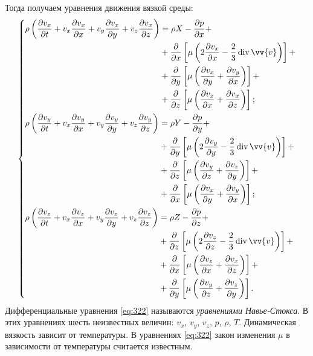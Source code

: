	Тогда получаем уравнения движения вязкой среды:
	\begin{gather}
		\begin{dcases}\label{eq:322}
			\begin{aligned}
				\rho\left(\frac{\pp v_x}{\pp t} + v_x\frac{\pp v_x}{\pp x} + v_y\frac{\pp v_x}{\pp y} + v_z\frac{\pp v_x}{\pp z}\right) &= \rho X - \frac{\pp p}{\pp x} +\\&+ \frac{\pp}{\pp x}\left[\mu\left(2\frac{\pp v_x}{\pp x} - \frac{2}{3}\diverg\vv{v}\right)\right] +\\&+ \frac{\pp}{\pp y}\left[\mu\left(\frac{\pp v_x}{\pp y} + \frac{\pp v_y}{\pp x}\right)\right] +\\&+ \frac{\pp}{\pp z}\left[\mu\left(\frac{\pp v_z}{\pp x} + \frac{\pp v_x}{\pp z}\right)\right];
			\end{aligned}\\
			\begin{aligned}
				\rho\left(\frac{\pp v_y}{\pp t} + v_x\frac{\pp v_y}{\pp x} + v_y\frac{\pp v_y}{\pp y} + v_z\frac{\pp v_y}{\pp z}\right) &= \rho Y - \frac{\pp p}{\pp y} +\\&+ \frac{\pp}{\pp y}\left[\mu\left(2\frac{\pp v_y}{\pp y} - \frac{2}{3}\diverg\vv{v}\right)\right] +\\&+ \frac{\pp}{\pp z}\left[\mu\left(\frac{\pp v_y}{\pp z} + \frac{\pp v_z}{\pp y}\right)\right] +\\&+ \frac{\pp}{\pp x}\left[\mu\left(\frac{\pp v_x}{\pp y} + \frac{\pp v_y}{\pp x}\right)\right];
			\end{aligned}\\
			\begin{aligned}
				\rho\left(\frac{\pp v_z}{\pp t} + v_x\frac{\pp v_z}{\pp x} + v_y\frac{\pp v_z}{\pp y} + v_z\frac{\pp v_z}{\pp z}\right) &= \rho Z - \frac{\pp p}{\pp z} +\\&+ \frac{\pp}{\pp z}\left[\mu\left(2\frac{\pp v_z}{\pp z} - \frac{2}{3}\diverg\vv{v}\right)\right] +\\&+ \frac{\pp}{\pp x}\left[\mu\left(\frac{\pp v_z}{\pp x} + \frac{\pp v_x}{\pp z}\right)\right] +\\&+ \frac{\pp}{\pp y}\left[\mu\left(\frac{\pp v_y}{\pp z} + \frac{\pp v_z}{\pp y}\right)\right].
			\end{aligned}
		\end{dcases}
	\end{gather}\n
	Дифференциальные уравнения \eqref{eq:322} называются \textit{уравнениями Навье-Стокса}. В этих уравнениях шесть неизвестных величин: $v_x$, $v_y$, $v_z$, $p$, $\rho$, $T$. Динамическая вязкость зависит от температуры. В уравнениях \eqref{eq:322} закон изменения $\mu$ в зависимости от температуры считается известным.\n
